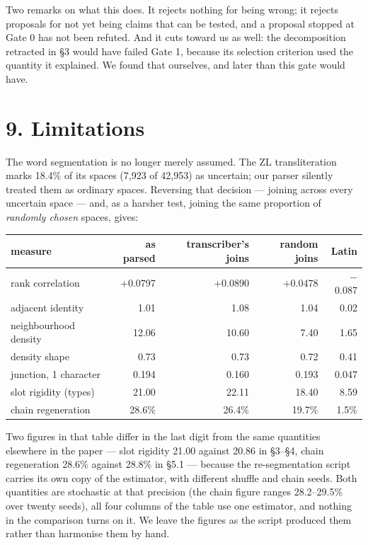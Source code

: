 \documentclass[11pt,a4paper]{article}
\begin{document}
Two remarks on what this does. It rejects nothing for being wrong; it rejects proposals for not yet being claims that can be tested, and a proposal stopped at Gate 0 has not been refuted. And it cuts toward us as well: the decomposition retracted in \S3 would have failed Gate 1, because its selection criterion used the quantity it explained. We found that ourselves, and later than this gate would have.


\section*{9. Limitations}


The word segmentation is no longer merely assumed. The ZL transliteration marks 18.4\% of its spaces (7,923 of 42,953) as uncertain; our parser silently treated them as ordinary spaces. Reversing that decision --- joining across every uncertain space --- and, as a harsher test, joining the same proportion of \emph{randomly chosen} spaces, gives:


\begin{table}[htbp]\centering\small
\begin{tabular}{@{}lrrrr@{}}
\toprule
measure & as parsed & transcriber's joins & random joins & Latin \\
\midrule
rank correlation & +0.0797 & +0.0890 & +0.0478 & $-$0.087 \\
adjacent identity & 1.01 & 1.08 & 1.04 & 0.02 \\
neighbourhood density & 12.06 & 10.60 & 7.40 & 1.65 \\
density shape & 0.73 & 0.73 & 0.72 & 0.41 \\
junction, 1 character & 0.194 & 0.160 & 0.193 & 0.047 \\
slot rigidity (types) & 21.00 & 22.11 & 18.40 & 8.59 \\
chain regeneration & 28.6\% & 26.4\% & 19.7\% & 1.5\% \\
\bottomrule
\end{tabular}
\end{table}


Two figures in that table differ in the last digit from the same quantities elsewhere in the paper --- slot rigidity 21.00 against 20.86 in \S3--\S4, chain regeneration 28.6\% against 28.8\% in \S5.1 --- because the re-segmentation script carries its own copy of the estimator, with different shuffle and chain seeds. Both quantities are stochastic at that precision (the chain figure ranges 28.2--29.5\% over twenty seeds), all four columns of the table use one estimator, and nothing in the comparison turns on it. We leave the figures as the script produced them rather than harmonise them by hand.
\end{document}
